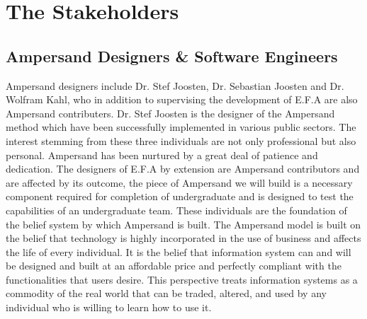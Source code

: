 \documentclass[12pt]{report}
\begin{document}
\section{The Stakeholders}\label{sec:Stakeholders}

\subsection{Ampersand Designers \& Software Engineers}\label{subsec:Ampersand}
Ampersand designers include Dr. Stef Joosten, Dr. Sebastian Joosten and Dr. 
Wolfram Kahl, who in addition to supervising the development of E.F.A are also 
Ampersand contributers. Dr. Stef Joosten is the designer of the Ampersand 
method which have been successfully implemented in various public sectors. The 
interest stemming from these three individuals are not only professional but 
also personal. Ampersand has been nurtured by a great deal of patience and 
dedication. The designers of E.F.A by extension are Ampersand contributors and 
are affected by its outcome, the piece of Ampersand we will build is a 
necessary component required for completion of undergraduate and is designed to 
test the capabilities of an undergraduate team. 
These individuals are the foundation of the belief system by which Ampersand is 
built. The Ampersand model is built on the belief that technology is highly 
incorporated in the use of business and affects the life of every individual. 
It is the belief that information system can and will be designed and built at 
an affordable price and perfectly compliant with the functionalities that users 
desire. This perspective treats information systems as a commodity of the real 
world that can be traded, altered, and used by any individual who is willing to 
learn how to use it.
\end{document}
